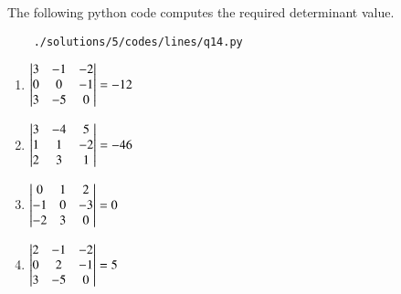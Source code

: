 
The following python code computes the required determinant value.
	\begin{lstlisting}
	./solutions/5/codes/lines/q14.py
	\end{lstlisting}
	
	\begin{enumerate}
		\item $\begin{vmatrix}3&-1&-2\\0&0&-1\\3&-5&0\end{vmatrix} = -12$
		\item $\begin{vmatrix}3&-4&5\\1&1&-2\\2&3&1\end{vmatrix} = -46$
		\item $\begin{vmatrix}0&1&2\\-1&0&-3\\-2&3&0\end{vmatrix}=0$
		\item $\begin{vmatrix}2&-1&-2\\0&2&-1\\3&-5&0\end{vmatrix} = 5$

	\end{enumerate}
